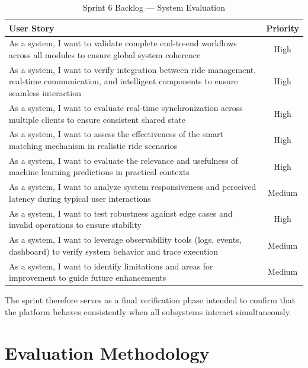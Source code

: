 \begin{table}[H]
\centering
\renewcommand{\arraystretch}{1.2}
\setlength{\tabcolsep}{5pt}

\begin{tabular}{|p{}|c|}
\hline
\textbf{User Story} & \textbf{Priority} \\
\hline
As a system, I want to validate complete end-to-end workflows across all modules to ensure global system coherence & High \\
\hline
As a system, I want to verify integration between ride management, real-time communication, and intelligent components to ensure seamless interaction & High \\
\hline
As a system, I want to evaluate real-time synchronization across multiple clients to ensure consistent shared state & High \\
\hline
As a system, I want to assess the effectiveness of the smart matching mechanism in realistic ride scenarios & High \\
\hline
As a system, I want to evaluate the relevance and usefulness of machine learning predictions in practical contexts & High \\
\hline
As a system, I want to analyze system responsiveness and perceived latency during typical user interactions & Medium \\
\hline
As a system, I want to test robustness against edge cases and invalid operations to ensure stability & High \\
\hline
As a system, I want to leverage observability tools (logs, events, dashboard) to verify system behavior and trace execution & Medium \\
\hline
As a system, I want to identify limitations and areas for improvement to guide future enhancements & Medium \\
\hline
\end{tabular}

\caption{Sprint 6 Backlog — System Evaluation}
\end{table}

The sprint therefore serves as a final verification phase intended to confirm that the platform behaves consistently when all subsystems interact simultaneously.


\section{Evaluation Methodology}

